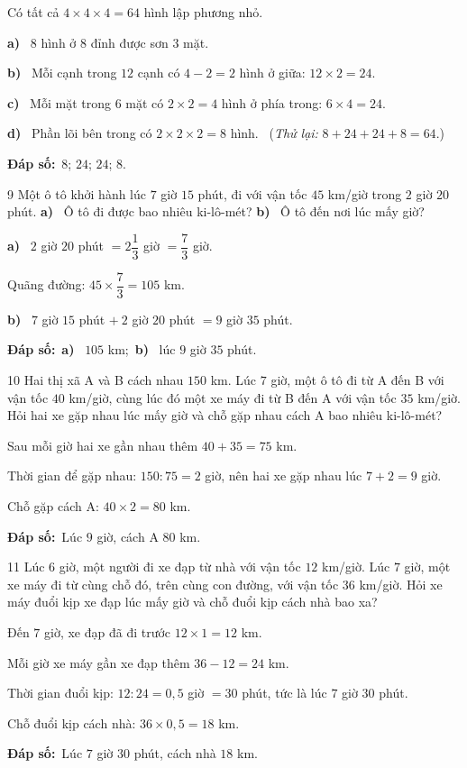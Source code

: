 \documentclass[11pt]{article}
\newif\ifsol \solfalse
\providecommand{\AnsWord}{Đáp số}
\newcommand{\dapso}[1]{\par\textbf{\AnsWord:}\ #1}
\newcommand{\probsol}[1]{%
  \begin{lrbox}{\solmeasure}\begin{minipage}{\dimexpr\linewidth-24pt\relax}#1\end{minipage}\end{lrbox}%
  \ifsol
    \begin{solbox}#1\end{solbox}%
  \else
    \setlength{\solht}{\dimexpr\ht\solmeasure+\dp\solmeasure+0.85cm\relax}%
    \ifdim\solht<1.35cm\setlength{\solht}{1.35cm}\fi
    \begin{tcolorbox}[colback=white,colframe=Line,boxrule=0.8pt,arc=5pt,
      left=8pt,right=8pt,top=4pt,bottom=4pt,height=\solht]{\footnotesize\color{Slate}\itshape\WorkWord}\end{tcolorbox}%
  \fi}
\newcommand{\pa}[1]{\textbf{#1)}\ }
\newcommand{\gap}{\vspace{0.3cm}}
\def\WorkWord{Bài làm:}
\def\AnsWord{Đáp số}
\begin{document}
\probsol{
Có tất cả $4\times4\times4=64$ hình lập phương nhỏ.\par
\pa{a} $8$ hình ở $8$ đỉnh được sơn $3$ mặt.\par
\pa{b} Mỗi cạnh trong $12$ cạnh có $4-2=2$ hình ở giữa: $12\times2=24$.\par
\pa{c} Mỗi mặt trong $6$ mặt có $2\times2=4$ hình ở phía trong: $6\times4=24$.\par
\pa{d} Phần lõi bên trong có $2\times2\times2=8$ hình. \ (\emph{Thử lại:} $8+24+24+8=64$.)
\dapso{$8$; $24$; $24$; $8$.}}
\gap
\begin{probbox}{9}{\relax}
Một ô tô khởi hành lúc $7$ giờ $15$ phút, đi với vận tốc $45$ km/giờ trong $2$ giờ $20$ phút. \pa{a} Ô tô đi được bao nhiêu ki-lô-mét? \pa{b} Ô tô đến nơi lúc mấy giờ?
\end{probbox}
\probsol{
\pa{a} $2$ giờ $20$ phút $=2\dfrac13$ giờ $=\dfrac73$ giờ.\par Quãng đường: $45\times\dfrac73=105$ km.\par
\pa{b} $7$ giờ $15$ phút $+\ 2$ giờ $20$ phút $=9$ giờ $35$ phút.
\dapso{\pa{a} $105$ km;\ \pa{b} lúc $9$ giờ $35$ phút.}}
\gap
\begin{probbox}{10}{\relax}
Hai thị xã A và B cách nhau $150$ km. Lúc $7$ giờ, một ô tô đi từ A đến B với vận tốc $40$ km/giờ, cùng lúc đó một xe máy đi từ B đến A với vận tốc $35$ km/giờ. Hỏi hai xe gặp nhau lúc mấy giờ và chỗ gặp nhau cách A bao nhiêu ki-lô-mét?
\end{probbox}
\probsol{
Sau mỗi giờ hai xe gần nhau thêm $40+35=75$ km.\par
Thời gian để gặp nhau: $150:75=2$ giờ, nên hai xe gặp nhau lúc $7+2=9$ giờ.\par
Chỗ gặp cách A: $40\times2=80$ km.
\dapso{Lúc $9$ giờ, cách A $80$ km.}}
\gap
\begin{probbox}{11}{\relax}
Lúc $6$ giờ, một người đi xe đạp từ nhà với vận tốc $12$ km/giờ. Lúc $7$ giờ, một xe máy đi từ cùng chỗ đó, trên cùng con đường, với vận tốc $36$ km/giờ. Hỏi xe máy đuổi kịp xe đạp lúc mấy giờ và chỗ đuổi kịp cách nhà bao xa?
\end{probbox}
\probsol{
Đến $7$ giờ, xe đạp đã đi trước $12\times1=12$ km.\par
Mỗi giờ xe máy gần xe đạp thêm $36-12=24$ km.\par
Thời gian đuổi kịp: $12:24=0{,}5$ giờ $=30$ phút, tức là lúc $7$ giờ $30$ phút.\par
Chỗ đuổi kịp cách nhà: $36\times0{,}5=18$ km.
\dapso{Lúc $7$ giờ $30$ phút, cách nhà $18$ km.}}
\gap
\end{document}
